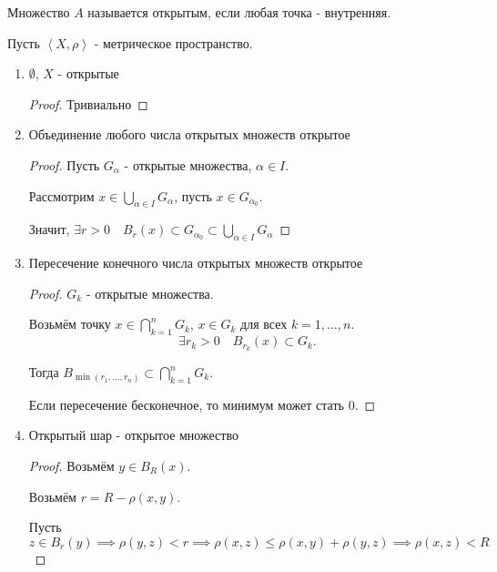 \begin{definition} \thmslashn 

    Множество $A$ называется открытым, если любая точка - внутренняя.
\end{definition}
\begin{theorem} \thmslashn

    Пусть $\left<X, \rho\right>$ - метрическое пространство.

    \begin{enumerate}
        \item $ \emptyset$, $X$ - открытые
            \begin{proof}
                Тривиально
            \end{proof}
        \item Объединение любого числа открытых множеств открытое
            \begin{proof}
                Пусть $G_{\alpha}$ - открытые множества, $\alpha\in I$.

                Рассмотрим $x\in \bigcup_{\alpha \in  I} G_{\alpha}$, пусть $x\in G_{\alpha_0}$.

                Значит, $\exists{r > 0}\quad B_{r}(x) \subset G_{\alpha_0} \subset \bigcup_{\alpha\in I} G_{\alpha}$
            \end{proof}
        \item Пересечение конечного числа открытых множеств открытое
            \begin{proof}
                $G_{k}$ - открытые множества.

                Возьмём точку $x\in \bigcap_{k=1}^{n} G_{k} $, $x\in G_{k}$ для всех $k = 1, \ldots, n$.
                \[ \exists{r_{k} > 0}\quad B_{r_k}(x) \subset G_{k}  .\]

                Тогда $B_{\min(r_1, \ldots, r_n)} \subset \bigcap_{k=1}^{n} G_{k}$.

                Если пересечение бесконечное, то минимум может стать $0$.
            \end{proof}
        \item Открытый шар - открытое множество
            \begin{proof}
                Возьмём $y\in B_{R}(x)$.

                Возьмём $r = R - \rho(x,y)$.

                Пусть $z\in B_{r}(y) \implies \rho(y, z) < r \implies \rho(x, z) \le  \rho(x, y) + \rho(y, z) \implies \rho(x, z) < R$
            \end{proof}
    \end{enumerate}
\end{theorem}
